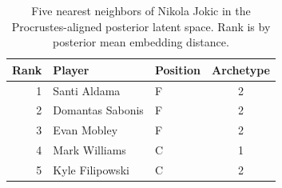 \begin{table}[htbp]
  \centering\small
  \begin{tabular}{rllc}
    \toprule
    Rank & Player & Position & Archetype \\
    \midrule
    1 & Santi Aldama & F & 2 \\
    2 & Domantas Sabonis & F & 2 \\
    3 & Evan Mobley & F & 2 \\
    4 & Mark Williams & C & 1 \\
    5 & Kyle Filipowski & C & 2 \\
    \bottomrule
  \end{tabular}
  \caption{Five nearest neighbors of Nikola Jokic in the Procrustes-aligned posterior latent space. Rank is by posterior mean embedding distance.}
  \label{tab:Nikola_Jokic_neighbors}
\end{table}

